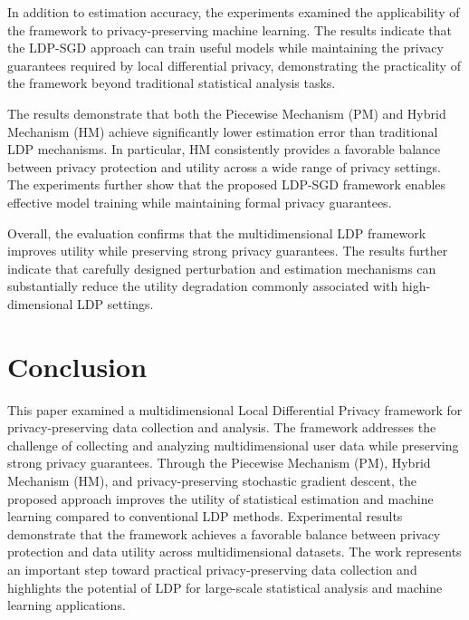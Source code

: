\documentclass[sigconf]{acmart}
\begin{document}
In addition to estimation accuracy, the experiments examined the applicability of the framework to privacy-preserving machine learning. The results indicate that the LDP-SGD approach can train useful models while maintaining the privacy guarantees required by local differential privacy, demonstrating the practicality of the framework beyond traditional statistical analysis tasks.

The results demonstrate that both the Piecewise Mechanism
(PM) and Hybrid Mechanism (HM) achieve significantly lower estimation
error than traditional LDP mechanisms. In particular, HM
consistently provides a favorable balance between privacy protection and
utility across a wide range of privacy settings. The
experiments further show that the proposed LDP-SGD framework
enables effective model training while maintaining formal privacy
guarantees.

Overall, the evaluation confirms that the multidimensional LDP framework improves utility while preserving strong privacy guarantees. The results further indicate that carefully designed perturbation and estimation mechanisms can substantially reduce the utility degradation commonly associated with high-dimensional LDP settings.




%
%
%

\section{Conclusion}

This paper examined a multidimensional Local Differential Privacy framework for privacy-preserving data collection and analysis.
 The framework addresses the challenge of collecting and analyzing multidimensional user data while preserving strong privacy guarantees. Through the Piecewise Mechanism (PM), Hybrid Mechanism (HM), and privacy-preserving stochastic gradient descent, the proposed approach improves the utility of statistical estimation and machine learning compared to conventional LDP methods. Experimental results demonstrate that the framework achieves a favorable balance between privacy protection and data utility across multidimensional datasets. The work represents an important step toward practical privacy-preserving data collection and highlights the potential of LDP for large-scale statistical analysis and machine learning applications.




\end{document}
